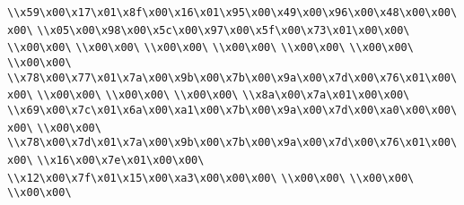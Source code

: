 \verb|\\x59\x00\x17\x01\x8f\x00\x16\x01\x95\x00\x49\x00\x96\x00\x48\x00\x00\x00\|\newline
\verb|\\x05\x00\x98\x00\x5c\x00\x97\x00\x5f\x00\x73\x01\x00\x00\|\newline
\verb|\\x00\x00\|\newline
\verb|\\x00\x00\|\newline
\verb|\\x00\x00\|\newline
\verb|\\x00\x00\|\newline
\verb|\\x00\x00\|\newline
\verb|\\x00\x00\|\newline
\verb|\\x00\x00\|\newline
\verb|\\x78\x00\x77\x01\x7a\x00\x9b\x00\x7b\x00\x9a\x00\x7d\x00\x76\x01\x00\x00\|\newline
\verb|\\x00\x00\|\newline
\verb|\\x00\x00\|\newline
\verb|\\x00\x00\|\newline
\verb|\\x8a\x00\x7a\x01\x00\x00\|\newline
\verb|\\x69\x00\x7c\x01\x6a\x00\xa1\x00\x7b\x00\x9a\x00\x7d\x00\xa0\x00\x00\x00\|\newline
\verb|\\x00\x00\|\newline
\verb|\\x78\x00\x7d\x01\x7a\x00\x9b\x00\x7b\x00\x9a\x00\x7d\x00\x76\x01\x00\x00\|\newline
\verb|\\x16\x00\x7e\x01\x00\x00\|\newline
\verb|\\x12\x00\x7f\x01\x15\x00\xa3\x00\x00\x00\|\newline
\verb|\\x00\x00\|\newline
\verb|\\x00\x00\|\newline
\verb|\\x00\x00\|\newline
